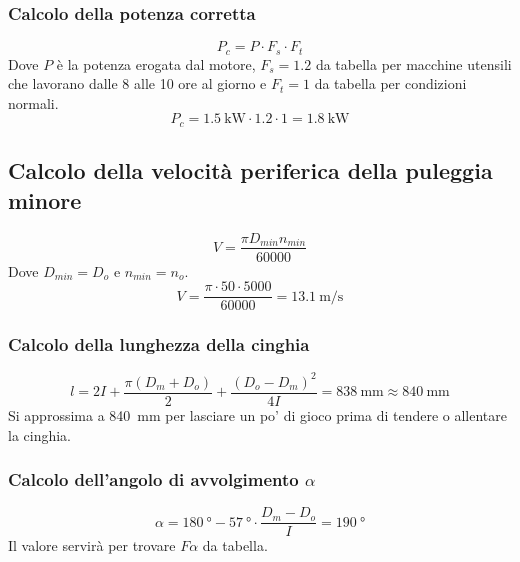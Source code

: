 \documentclass{report}
\begin{document}
\subsubsection{Calcolo della potenza corretta}
\begin{equation}
P_c=P\cdot F_s\cdot F_t
\end{equation}
Dove $P$ è la potenza erogata dal motore, $F_s=\num{1,2}$ da tabella per macchine utensili che lavorano dalle 8 alle 10 ore al giorno e $F_t=1$ da tabella per condizioni normali.
\begin{equation}
P_c = \SI{1,5}{\kW}\cdot \num{1,2}\cdot 1 = \SI{1,8}{\kW}
\end{equation}
\subsection{Calcolo della velocità periferica della puleggia minore}
\begin{equation}
  V = \frac{\pi D_{min}n_{min}}{\num{60000}}
\end{equation}
Dove $D_{min}=D_o$ e $n_{min}=n_o$.
\begin{equation}
V=\frac{\pi\cdot 50\cdot 5000}{\num{60000}} = \SI{13,1}{\m\per\s}
\end{equation}

\subsubsection{Calcolo della lunghezza della cinghia}
\begin{equation}
  l=2I+\frac{\pi (D_m+D_o)}{2}+\frac{(D_o-D_m)^2}{4I}=\SI{838}{\mm}\approx\SI{840}{\mm}
\end{equation}
Si approssima a \SI{840}{\mm} per lasciare un po' di gioco prima di tendere o allentare la cinghia.

\subsubsection{Calcolo dell’angolo di avvolgimento $\alpha$}
\begin{equation}
  \alpha = \SI{180}{\degree}-\SI{57}{\degree}\cdot\frac{D_m-D_o}{I}=\SI{190}{\degree}
\end{equation}
Il valore servirà per trovare $F\alpha$ da tabella.
\end{document}

